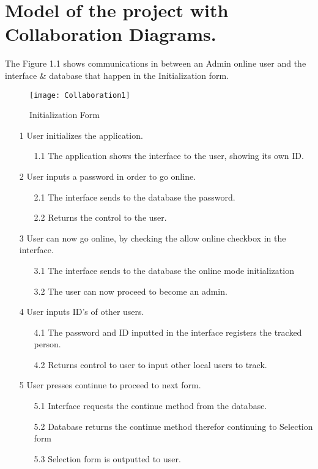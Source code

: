 
\setlength{\parindent}{2ex}
\section{Model of the project with Collaboration Diagrams.}
The Figure 1.1 shows communications in between an Admin online user and the interface \& database that happen in the Initialization form.
\begin{figure}[h!]
	\centering
	\texttt{[image: Collaboration1]}
	\caption{Initialization Form} 
\end{figure}
\begin{flushleft}
\begin{enumerate}
   \item[1] User initializes the application.
   \begin{itemize}
     \item[1.1] The application shows the interface to the user, showing its own ID.
   \end{itemize}
   \item[2] User inputs a password in order to go online.
   \begin{itemize}
     \item[2.1] The interface sends to the database the password.
     \item[2.2] Returns the control to the user.
   \end{itemize}
   \item[3] User can now go online, by checking the allow online checkbox in the interface.
   \begin{itemize}
     \item[3.1] The interface sends to the database the online mode initialization
     \item[3.2] The user can now proceed to become an admin.
   \end{itemize}
   \item[4] User inputs ID's of other users.
   \begin{itemize}
     \item[4.1]	The password and ID inputted in the interface registers the tracked person.
     \item[4.2] Returns control to user to input other local users to track.
   \end{itemize}
   \item[5] User presses continue to proceed to next form.
   \begin{itemize}
     \item[5.1] Interface requests the continue method from the database.
     \item[5.2] Database returns the continue method therefor continuing to Selection form
     \item[5.3] Selection form is outputted to user.
   \end{itemize}
\end{enumerate}
\end{flushleft}
